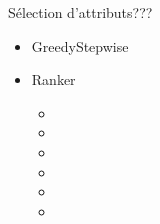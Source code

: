 \begin{frame}{Sélection d'attributs}{???}
  
  \begin{itemize}
  \item GreedyStepwise
  \item Ranker 
    \begin{itemize}
    \item {}
    \item {}
    \item {}
    \item {}
    \item {}
    \item {}
    \end{itemize}
  \end{itemize}
\end{frame}
